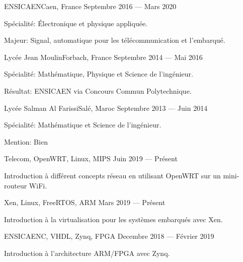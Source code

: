 \documentclass{faresume}
\begin{document}
\begin{column}[\leftcolumnwidth]

			{ENSICAEN}{Caen, France}
			{Septembre 2016 --- Mars 2020}
			{%
				\begin{additems}
					\item Spécialité: Électronique et physique appliquée.
					\item Majeur: Signal, automatique pour les télécommunication et l'embarqué.
				\end{additems}
			}

			{Lycée Jean Moulin}{Forbach, France}
			{Septembre 2014 --- Mai 2016}
			{%
				\begin{additems}
					\item Spécialité: Mathématique, Physique et Science de l'ingénieur.
					\item Résultat: ENSICAEN via Concours Commun Polytechnique.
				\end{additems}
			}

			{Lycée Salman Al Farissi}{Salé, Maroc}
			{Septembre 2013 --- Juin 2014}
			{%
				\begin{additems}
					\item Spécialité: Mathématique et Science de l'ingénieur.
					\item Mention: Bien
				\end{additems}
			}


			{}{Telecom, OpenWRT, Linux, MIPS}
			{Juin 2019 --- Présent}
			{%
				\begin{additems}
					\item Introduction à différent concepts réseau en utilisant OpenWRT sur un mini-routeur WiFi.
				\end{additems}
			}

			{}{Xen, Linux, FreeRTOS, ARM}
			{Mars 2019 --- Présent}
			{%
				\begin{additems}
					\item Introduction à la virtualisation pour les systèmes embarqués avec Xen.
				\end{additems}
			}

			{ENSICAEN}{C, VHDL, Zynq, FPGA}
			{Decembre 2018 --- Février 2019}
			{%
				\begin{additems}
					\item Introduction à l'architecture ARM/FPGA avec Zynq.
				\end{additems}
			}


\end{column}
\end{document}

